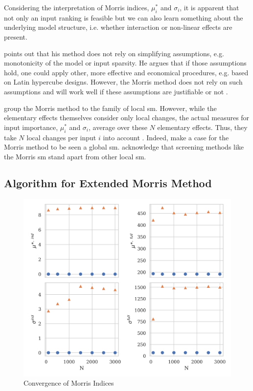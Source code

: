 Considering the interpretation of Morris indices, $\mu_i^\ast$ and $\sigma_i$, it is apparent that not only an input ranking is feasible but we can also learn something about the underlying model structure, i.e. whether interaction or non-linear effects are present.

\citet{M91} points out that his method does not rely on simplifying assumptions, e.g. monotonicity of the model or input sparsity. He argues that if those assumptions hold, one could apply other, more effective and economical procedures, e.g. based on Latin hypercube designs. However, the Morris method does not rely on such assumptions and will work well if these assumptions are justifiable or not \citep{M91}.

\citet{BP16} group the Morris method to the family of local sm. However, while the elementary effects themselves consider only local changes, the actual measures for input importance, $\mu_i^\ast$ and $\sigma_i$, average over these $N$ elementary effects. Thus, they take $N$ local changes per input $i$ into account \citep{M91}. Indeed, \citet{CCS11} make a case for the Morris method to be seen a global sm. \citet{BP16} acknowledge that screening methods like the Morris sm stand apart from other local sm.

\subsection{Algorithm for Extended Morris Method}

\begin{figure}[t]
	\caption{Convergence of Morris Indices}
    \label{morris_convergence}
	\vspace*{-4mm}
	\centering
	\includegraphics[scale=0.9]{../figures/morris_convergence.png}
\end{figure}

